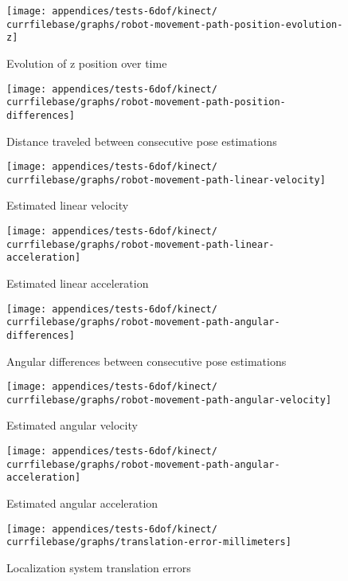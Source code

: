 \begin{figure}[H]
	\centering
	\texttt{[image: appendices/tests-6dof/kinect/\\currfilebase/graphs/robot-movement-path-position-evolution-z]}
	\caption{Evolution of z position over time}
\end{figure}


\begin{figure}[H]
	\centering
	\texttt{[image: appendices/tests-6dof/kinect/\\currfilebase/graphs/robot-movement-path-position-differences]}
	\caption{Distance traveled between consecutive pose estimations}
\end{figure}

\begin{figure}[H]
	\centering
	\texttt{[image: appendices/tests-6dof/kinect/\\currfilebase/graphs/robot-movement-path-linear-velocity]}
	\caption{Estimated linear velocity}
\end{figure}

\begin{figure}[H]
	\centering
	\texttt{[image: appendices/tests-6dof/kinect/\\currfilebase/graphs/robot-movement-path-linear-acceleration]}
	\caption{Estimated linear acceleration}
\end{figure}


\begin{figure}[H]
	\centering
	\texttt{[image: appendices/tests-6dof/kinect/\\currfilebase/graphs/robot-movement-path-angular-differences]}
	\caption{Angular differences between consecutive pose estimations}
\end{figure}

\begin{figure}[H]
	\centering
	\texttt{[image: appendices/tests-6dof/kinect/\\currfilebase/graphs/robot-movement-path-angular-velocity]}
	\caption{Estimated angular velocity}
\end{figure}

\begin{figure}[H]
	\centering
	\texttt{[image: appendices/tests-6dof/kinect/\\currfilebase/graphs/robot-movement-path-angular-acceleration]}
	\caption{Estimated angular acceleration}
\end{figure}


\begin{figure}[H]
	\centering
	\texttt{[image: appendices/tests-6dof/kinect/\\currfilebase/graphs/translation-error-millimeters]}
	\caption{Localization system translation errors}
\end{figure}


